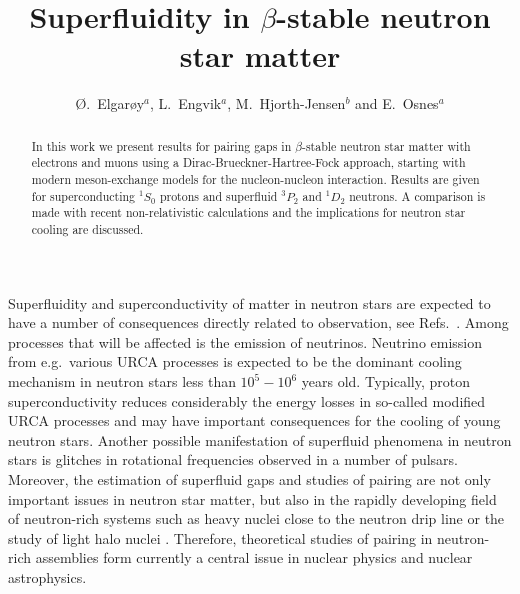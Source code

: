 

\draft

\title{Superfluidity in $\beta$-stable neutron star matter}
 
\author{\O.\ Elgar\o y$^a$, L.\ Engvik$^a$, M.\ Hjorth-Jensen$^b$
        and E.\ Osnes$^a$}

\address{$^a$Department of Physics, University of Oslo, N-0316 Oslo, Norway}


\address{$^b$European Centre for Theoretical Studies in 
        Nuclear Physics and Related Areas, Trento, Italy}

\maketitle



\begin{abstract}

In this work we present results for pairing gaps in
$\beta$-stable neutron star matter with electrons and
muons
using a Dirac-Brueckner-Hartree-Fock
approach, starting with modern meson-exchange models for the 
nucleon-nucleon interaction.  
Results are given for superconducting $^1S_0$ protons
and superfluid $^3P_2$ and $^1D_2$ neutrons. 
A comparison is made with recent non-relativistic calculations
and the implications for neutron star cooling are discussed.

\end{abstract}







Superfluidity and superconductivity of matter in neutron stars are 
expected to have a number of consequences directly related 
to observation, see Refs.\ \cite{st83,pr95,pethick92,page94,prakash94}. 
Among processes that will be affected is the
emission of neutrinos. Neutrino emission from e.g.\ 
various URCA processes  is expected to be the dominant 
cooling mechanism in neutron stars less than $10^5-10^6$ years old.
Typically,
proton superconductivity  reduces considerably the energy losses
in so-called modified URCA processes 
and may have important consequences for the
cooling of young neutron stars.
Another  possible manifestation of superfluid 
phenomena in neutron stars  
is glitches in rotational frequencies  observed in a number
of pulsars. Moreover, 
the estimation of superfluid gaps and studies of pairing 
are not only important issues
in neutron star matter, but also in the rapidly developing 
field of neutron-rich systems such as heavy nuclei
close to the neutron drip line \cite{ms93} or the study of 
light halo nuclei \cite{riisager94}. 
Therefore, theoretical studies
of pairing in neutron-rich assemblies form currently a central
issue in nuclear physics and nuclear astrophysics. 


